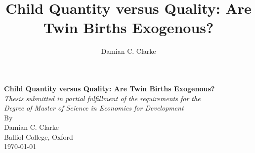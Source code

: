 \documentclass{article}[11pt,subeqn]
\title{Child Quantity versus Quality: Are Twin Births Exogenous?}
\author{Damian C. Clarke}
\begin{document}
\begin{spacing}{1.25}


\begin{titlepage}
\begin{center} 
\textbf{\Large Child Quantity versus Quality: Are Twin Births Exogenous?}\\
\vspace{3cm}
\emph{Thesis submitted in partial fulfillment of the requirements for the\\
Degree of Master of Science in Economics for Development}\\ 
\vspace{0.2cm}
\vspace{3.5cm}
By\\
\vspace{2.5cm}
Damian C. Clarke\\
Balliol College, Oxford\\
\today\\
\vspace{5cm}
\end{center}
\end{titlepage}


\end{spacing}
\end{document}

